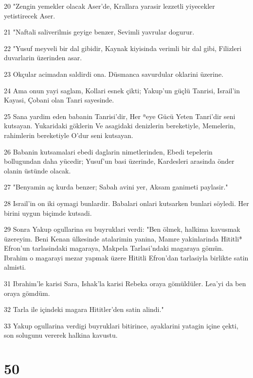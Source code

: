 \par 20 "Zengin yemekler olacak Aser'de, Krallara yarasir lezzetli yiyecekler yetistirecek Aser.
\par 21 "Naftali saliverilmis geyige benzer, Sevimli yavrular dogurur.
\par 22 "Yusuf meyveli bir dal gibidir, Kaynak kiyisinda verimli bir dal gibi, Filizleri duvarlarin üzerinden asar.
\par 23 Okçular acimadan saldirdi ona. Düsmanca savurdular oklarini üzerine.
\par 24 Ama onun yayi saglam, Kollari esnek çikti; Yakup'un güçlü Tanrisi, Israil'in Kayasi, Çobani olan Tanri sayesinde.
\par 25 Sana yardim eden babanin Tanrisi'dir, Her ªeye Gücü Yeten Tanri'dir seni kutsayan. Yukaridaki göklerin Ve asagidaki denizlerin bereketiyle, Memelerin, rahimlerin bereketiyle O'dur seni kutsayan.
\par 26 Babanin kutsamalari ebedi daglarin nimetlerinden, Ebedi tepelerin bollugundan daha yücedir; Yusuf'un basi üzerinde, Kardesleri arasinda önder olanin üstünde olacak.
\par 27 "Benyamin aç kurda benzer; Sabah avini yer, Aksam ganimeti paylasir."
\par 28 Israil'in on iki oymagi bunlardir. Babalari onlari kutsarken bunlari söyledi. Her birini uygun biçimde kutsadi.
\par 29 Sonra Yakup ogullarina su buyruklari verdi: "Ben ölmek, halkima kavusmak üzereyim. Beni Kenan ülkesinde atalarimin yanina, Mamre yakinlarinda Hititli* Efron'un tarlasindaki magaraya, Makpela Tarlasi'ndaki magaraya gömün. Ibrahim o magarayi mezar yapmak üzere Hititli Efron'dan tarlasiyla birlikte satin almisti.
\par 31 Ibrahim'le karisi Sara, Ishak'la karisi Rebeka oraya gömüldüler. Lea'yi da ben oraya gömdüm.
\par 32 Tarla ile içindeki magara Hititler'den satin alindi."
\par 33 Yakup ogullarina verdigi buyruklari bitirince, ayaklarini yatagin içine çekti, son solugunu vererek halkina kavustu.

\chapter{50}

